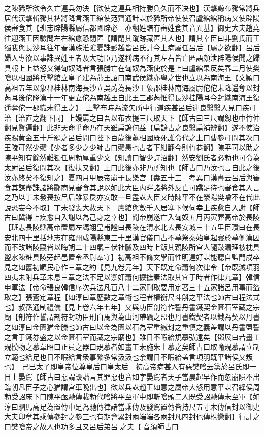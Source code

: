之陳豨所欲令久亡連兵勿決【欲使之連兵相持勝負久而不决也】漢擊黥布豨常將兵居代漢擊斬豨其裨將降言燕王綰使范齊通計謀於豨所帝使使召盧綰綰稱病又使辟陽侯審食其【班志辟陽縣屬信都國辟必　亦翻姓譜有審姓食其音異基】御史大夫趙堯往迎燕王因驗問左右綰愈恐閉匿【謂閉其蹤跡藏匿其人也】謂其幸臣曰非劉氏而王獨我與長沙耳往年春漢族淮隂夏誅彭越皆呂氏計今上病屬任呂后【屬之欲翻】呂后婦人專欲以事誅異姓王者及大功臣乃遂稱病不行其左右皆亡匿語頗泄辟陽侯聞之歸具報上上益怒又得匈奴降者言張勝亡在匈奴為燕使於是上曰盧綰果反矣春二月使樊噲以相國將兵擊綰立皇子建為燕王詔曰南武侯織亦粤之世也立以為南海王【文頴曰高祖五年以象郡桂林南海長沙立吳芮為長沙王象郡桂林南海屬尉佗佗未降遥奪以封芮耳後佗降漢十一年更立佗為南越王自此王三郡芮惟得長沙桂陽耳今封織南海王復遥奪佗一郡織未得王之】　上擊布時為流矢所中行道疾甚呂后迎良醫醫入見曰疾可治【治直之翻下同】上嫚罵之曰吾以布衣提三尺取天下【師古曰三尺謂劔也中竹仲翻見賢遍翻】此非天命乎命乃在天雖扁鵲何益【扁鵲古之良醫扁補辨翻】遂不使治疾賜黄金五十斤罷之呂后問曰陛下百歲後蕭相國既死誰令代之上曰曹參可問其次曰王陵可然少戇【少者多少之少師古曰戇愚也古者下紺翻今則竹巷翻】陳平可以助之陳平知有餘然難獨任周勃厚重少文【知讀曰智少詩沼翻】然安劉氏者必勃也可令為太尉呂后復問其次【復扶又翻】上曰此後亦非乃所知也【師古曰乃汝也言自此之後汝亦終矣不復知之】夏四月甲辰帝崩于長樂宫【夀五十三　考異曰漢書云呂后與審食其謀盡誅諸將酈商見審食其說以如此大臣内畔諸將外反亡可蹻足待也審食其入言之乃以丁未發喪按呂后雖暴戾亦安敢一旦盡誅大臣又時陳平不在滎陽樊噲不在代此說恐妄今不取】丁未發喪大赦天下　盧綰與數千人居塞下候伺幸上疾愈自入謝【師古曰冀得上疾愈自入謝以為己身之幸也】聞帝崩遂亡入匈奴五月丙寅葬高帝於長陵【班志長陵縣高帝置屬左馮翊皇甫謐曰長陵在渭水北去長安城三十五里臣瓚曰在長安北四十里括地志在雍州咸陽縣東三十里漢官儀曰古不墓祭秦始皇起寢於墓側漢因而不改諸陵寢皆以晦朔二十四氣三伏社臘及四時上飯其親陵所宫人隨鼓漏理被枕具盥水陳粧具陵旁起邑置令丞尉奉守】初高祖不脩文學而性明達好謀能聽自監門戍卒見之如舊初順民心作三章之約【見九卷元年】天下既定命蕭何次律令【帝既滅項羽四夷未附兵革未息三章之法不足以禦奸蕭何攗摭秦法取其宜于時者作律九章】韓信申軍法【帝命張良韓信序次兵法凡百八十二家刪取要用定著三十五家諸呂用事而盜取之】張蒼定章程【如淳曰章歷數之章術也程者權衡尺斗斛之平法也師古曰程法式也】叔孫通制禮儀【見上卷六年七年】又與功臣剖符作誓丹書鐵契金匱石室藏之宗廟【剖符作誓謂剖符封功臣刑白馬與為山河帶礪之盟也丹書鐵契者以鐵為契以丹書之如淳曰金匱猶金縢也師古曰以金為匱以石為室重緘封之重慎之義盖謂以丹書盟誓之言于鐵券盛之以金匱石室而藏之宗廟也】雖日不暇給規摹弘遠矣【鄧展曰若畫工規模物之摹韋昭曰正員之器曰規摹者如畫工未施朱土摹之矣師古曰取喻規摹謂立制立範也給足也日不暇給言衆事繁多常汲汲也余謂日不暇給盖言項羽既平諸侯又叛也】　己巳太子即皇帝位尊皇后曰皇太后　初高帝病甚人有惡樊噲云黨於呂氏即一日上晏駕【師古曰惡謂毁譛言其罪惡也音如字晏駕者天子當晨起早作而忽崩隕不出臨朝凡臣子之心猶謂宫車晚出也】欲以兵誅趙王如意之屬帝大怒用意平謀召絳侯周勃受詔床下曰陳平亟馳傳載勃代噲將平至軍中即斬噲頭二人既受詔馳傳未至軍【如淳曰駟馬高足為置傳中足為馳傳律諸當乘傳及發駕置傳皆持尺五寸木傳信封以御史大夫印章其乘傳參封之參三也有期會累封兩端端各兩封凡四封也傳株戀翻】行計之曰樊噲帝之故人也功多且又呂后弟呂之夫【音須師古曰